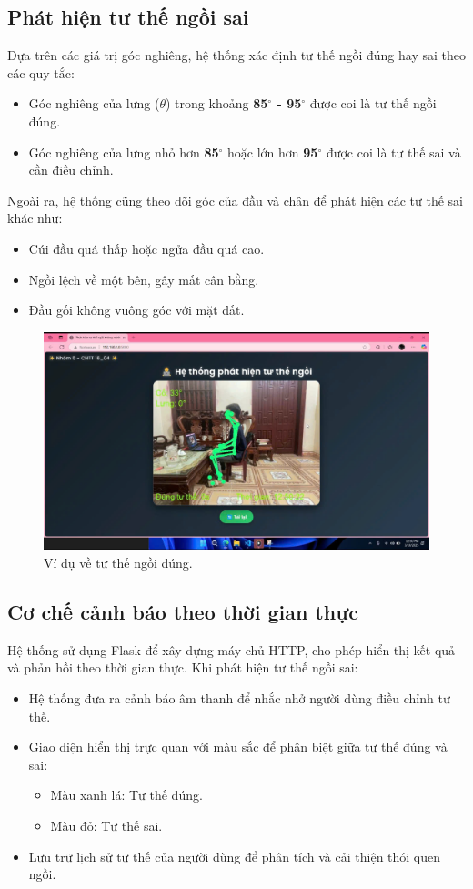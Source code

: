 \documentclass[journal,onecolumn]{IEEEtran}
\begin{document}
\subsection{\textbf{Phát hiện tư thế ngồi sai}}
Dựa trên các giá trị góc nghiêng, hệ thống xác định tư thế ngồi đúng hay sai theo các quy tắc:
\begin{itemize}
    \item Góc nghiêng của lưng (\(\theta\)) trong khoảng \textbf{85$^\circ$ - 95$^\circ$} được coi là tư thế ngồi đúng.
    \item Góc nghiêng của lưng nhỏ hơn \textbf{85$^\circ$} hoặc lớn hơn \textbf{95$^\circ$} được coi là tư thế sai và cần điều chỉnh.
\end{itemize}

Ngoài ra, hệ thống cũng theo dõi góc của đầu và chân để phát hiện các tư thế sai khác như:
\begin{itemize}
    \item Cúi đầu quá thấp hoặc ngửa đầu quá cao.
    \item Ngồi lệch về một bên, gây mất cân bằng.
    \item Đầu gối không vuông góc với mặt đất.
\end{itemize}

\begin{figure}[H]
    \centering
    \includegraphics[width=0.7\linewidth]{images/sitting_posture_correct.png}
    \caption{Ví dụ về tư thế ngồi đúng.}
    \label{fig:sitting_posture_correct}
\end{figure}

\subsection{\textbf{Cơ chế cảnh báo theo thời gian thực}}
Hệ thống sử dụng Flask để xây dựng máy chủ HTTP, cho phép hiển thị kết quả và phản hồi theo thời gian thực. Khi phát hiện tư thế ngồi sai:
\begin{itemize}
    \item Hệ thống đưa ra cảnh báo âm thanh để nhắc nhở người dùng điều chỉnh tư thế.
    \item Giao diện hiển thị trực quan với màu sắc để phân biệt giữa tư thế đúng và sai:
    \begin{itemize}
        \item Màu xanh lá: Tư thế đúng.
        \item Màu đỏ: Tư thế sai.
    \end{itemize}
    \item Lưu trữ lịch sử tư thế của người dùng để phân tích và cải thiện thói quen ngồi.
\end{itemize}
\end{document}
